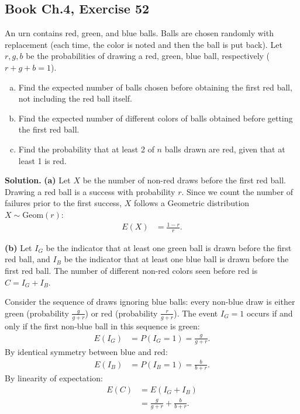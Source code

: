 \documentclass[11pt,a4paper]{article}
\begin{document}
\vspace{10pt}
\subsection{Book Ch.4, Exercise 52}
\begin{tcolorbox}[title={Book Ch.4, Exercise 52}]
An urn contains red, green, and blue balls. Balls are chosen randomly with replacement (each time, the color is noted and then the ball is put back). Let $r, g, b$ be the probabilities of drawing a red, green, blue ball, respectively ($r + g + b = 1$).
\begin{enumerate}[(a)]
\item Find the expected number of balls chosen before obtaining the first red ball, not including the red ball itself.
\item Find the expected number of different colors of balls obtained before getting the first red ball.
\item Find the probability that at least 2 of $n$ balls drawn are red, given that at least 1 is red.
\end{enumerate}
\end{tcolorbox}

\noindent \textbf{Solution.} \textbf{(a)} Let $X$ be the number of non-red draws before the first red ball. Drawing a red ball is a success with probability $r$. Since we count the number of failures prior to the first success, $X$ follows a Geometric distribution $X \sim \text{Geom}(r)$:
\begin{align*}
E(X) &= \frac{1 - r}{r}.
\end{align*}

\vspace{4pt}
\noindent \textbf{(b)} Let $I_G$ be the indicator that at least one green ball is drawn before the first red ball, and $I_B$ be the indicator that at least one blue ball is drawn before the first red ball. The number of different non-red colors seen before red is $C = I_G + I_B$. 

Consider the sequence of draws ignoring blue balls: every non-blue draw is either green (probability $\frac{g}{g+r}$) or red (probability $\frac{r}{g+r}$). The event $I_G = 1$ occurs if and only if the first non-blue ball in this sequence is green:
\begin{align*}
E(I_G) &= P(I_G = 1) = \frac{g}{g + r}.
\end{align*}
By identical symmetry between blue and red:
\begin{align*}
E(I_B) &= P(I_B = 1) = \frac{b}{b + r}.
\end{align*}
By linearity of expectation:
\begin{align*}
E(C) &= E(I_G + I_B) \\
&= \frac{g}{g + r} + \frac{b}{b + r}.
\end{align*}
\end{document}
